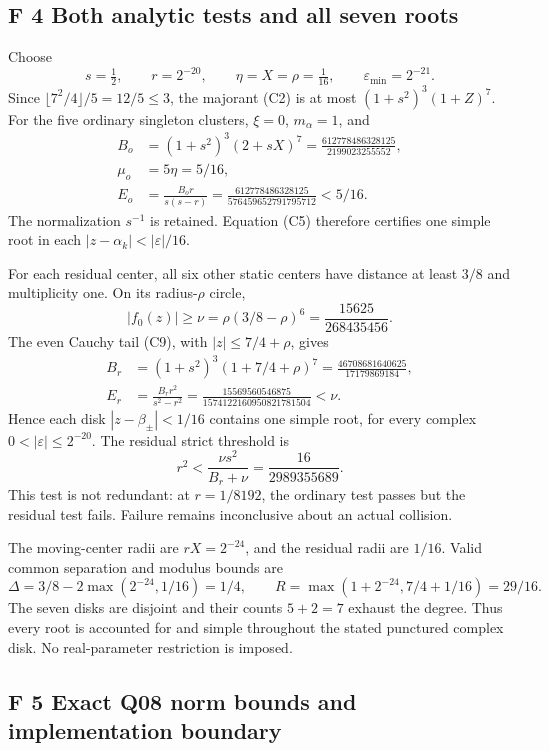 \documentclass[
  11pt,
]{article}
\begin{document}
\subsection{F 4 Both analytic tests and all seven roots}

Choose
\[
s=\tfrac12,\qquad r=2^{-20},\qquad
\eta=X=\rho=\tfrac1{16},\qquad\varepsilon_{\min}=2^{-21}.
\tag{F7}
\]
Since \(\lfloor7^2/4\rfloor/5=12/5\leq3\), the majorant (C2)
is at most \((1+s^2)^3(1+Z)^7\). For the five ordinary singleton
clusters, \(\xi=0\), \(m_\alpha=1\), and
\begin{align*}
B_o&=(1+s^2)^3(2+sX)^7
=\frac{612778486328125}{2199023255552},\\
\mu_o&=5\eta=5/16,\\
E_o&=\frac{B_o r}{s(s-r)}
=\frac{612778486328125}{576459652791795712}<5/16.
\end{align*}
The normalization \(s^{-1}\) is retained. Equation (C5) therefore
certifies one simple root in each
\(|z-\alpha_k|<|\varepsilon|/16\).

For each residual center, all six other static centers have distance at
least \(3/8\) and multiplicity one. On its radius-\(\rho\) circle,
\[
|f_0(z)|\geq\nu=\rho(3/8-\rho)^6
=\frac{15625}{268435456}. \tag{F8}
\]
The even Cauchy tail (C9), with \(|z|\leq7/4+\rho\), gives
\begin{align*}
B_r&=(1+s^2)^3(1+7/4+\rho)^7
=\frac{46708681640625}{17179869184},\\
E_r&=\frac{B_r r^2}{s^2-r^2}
=\frac{15569560546875}{1574122160950821781504}<\nu.
\end{align*}
Hence each disk \(|z-\beta_\pm|<1/16\) contains one simple root,
for every complex \(0<|\varepsilon|\leq2^{-20}\). The residual
strict threshold is
\[
r^2<\frac{\nu s^2}{B_r+\nu}=\frac{16}{2989355689}. \tag{F9}
\]
This test is not redundant: at \(r=1/8192\), the ordinary test passes
but the residual test fails. Failure remains inconclusive about an actual
collision.

The moving-center radii are \(rX=2^{-24}\), and the residual radii
are \(1/16\). Valid common separation and modulus bounds are
\[
\Delta=3/8-2\max(2^{-24},1/16)=1/4,\qquad
R=\max(1+2^{-24},7/4+1/16)=29/16. \tag{F10}
\]
The seven disks are disjoint and their counts \(5+2=7\) exhaust the
degree. Thus every root is accounted for and simple throughout the stated
punctured complex disk. No real-parameter restriction is imposed.

\subsection{F 5 Exact Q08 norm bounds and implementation boundary}
\end{document}

